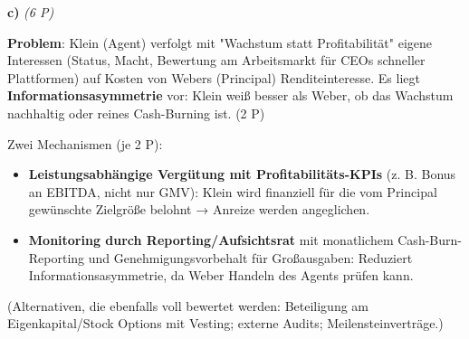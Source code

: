 \documentclass[11pt, a4paper]{article}
\begin{document}
\textbf{c)} \textit{(6 P)}

\textbf{Problem}: Klein (Agent) verfolgt mit "Wachstum statt Profitabilität" eigene Interessen (Status, Macht, Bewertung am Arbeitsmarkt für CEOs schneller Plattformen) auf Kosten von Webers (Principal) Renditeinteresse. Es liegt \textbf{Informationsasymmetrie} vor: Klein weiß besser als Weber, ob das Wachstum nachhaltig oder reines Cash-Burning ist. (2 P)


Zwei Mechanismen (je 2 P):

\begin{itemize}
  \item \textbf{Leistungsabhängige Vergütung mit Profitabilitäts-KPIs} (z. B. Bonus an EBITDA, nicht nur GMV): Klein wird finanziell für die vom Principal gewünschte Zielgröße belohnt → Anreize werden angeglichen.
  \item \textbf{Monitoring durch Reporting/Aufsichtsrat} mit monatlichem Cash-Burn-Reporting und Genehmigungsvorbehalt für Großausgaben: Reduziert Informationsasymmetrie, da Weber Handeln des Agents prüfen kann.
\end{itemize}

(Alternativen, die ebenfalls voll bewertet werden: Beteiligung am Eigenkapital/Stock Options mit Vesting; externe Audits; Meilensteinverträge.)





\end{document}
